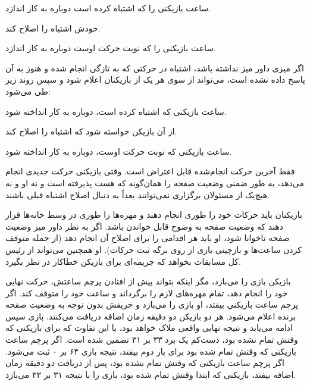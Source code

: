 \begin{bandha}
  \item[الف)] ساعت بازیکنی را که اشتباه کرده است دوباره به کار اندازد.
  \item[ب)] خودش اشتباه را اصلاح کند.
  \item[ج)] ساعت بازیکنی را که نوبت حرکت اوست دوباره به کار اندازد.
\end{bandha}

اگر میزی داور میز نداشته باشد، اشتباه در حرکتی که به تازگی انجام شده و هنوز به آن پاسخ داده نشده است، می‌تواند از سوی هر یک از بازیکنان اعلام شود و سپس روند زیر طی می‌شود:

\begin{bandha}
  \item[الف)] ساعت بازیکنی که اشتباه کرده است، دوباره به کار انداخته شود.
  \item[ب)] از آن بازیکن خواسته شود که اشتباه را اصلاح کند.
  \item[ج)] ساعت بازیکنی که نوبت حرکت اوست، دوباره به کار انداخته شود.
\end{bandha}


فقط آخرین حرکت انجام‌شده قابل اعتراض است. وقتی بازیکنی حرکت جدیدی انجام می‌دهد، به طور ضمنی وضعیت صفحه را همان‌گونه که هست پذیرفته است و نه او و نه هیچ‌یک از مسئولان برگزاری نمی‌توانند بعداً به دنبال اصلاح اشتباه قبلی باشند.


بازیکنان باید حرکات خود را طوری انجام دهند و مهره‌ها را طوری در وسط خانه‌ها قرار دهند که وضعیت صفحه به وضوح قابل خواندن باشد. اگر به نظر داور میز وضعیت صفحه ناخوانا شود، او باید هر اقدامی را برای اصلاح آن انجام دهد (از جمله متوقف کردن ساعت‌ها و بازچینی بازی از روی برگه ثبت حرکات). او همچنین می‌تواند از رئیس کل مسابقات بخواهد که جریمه‌ای برای بازیکن خطاکار در نظر بگیرد.


بازیکن بازی را می‌بازد، مگر اینکه بتواند پیش از افتادن پرچم ساعتش، حرکت نهایی خود را انجام دهد، تمام مهره‌های لازم را برگرداند و ساعت خود را متوقف کند. اگر پرچم ساعت بازیکنی بیفتد، او بازی را می‌بازد و حریفش بدون توجه به وضعیت صفحه برنده اعلام می‌شود. هر دو بازیکن دو دقیقه زمان اضافه دریافت می‌کنند. بازی سپس ادامه می‌یابد و نتیجه نهایی واقعی ملاک خواهد بود، با این تفاوت که برای بازیکنی که وقتش تمام نشده بود، دست‌کم یک برد ۳۳ بر ۳۱ تضمین شده است. اگر پرچم ساعت بازیکنی که وقتش تمام شده بود برای بار دوم بیفتد، نتیجه بازی ۶۴ بر ۰ ثبت می‌شود. اگر پرچم ساعت بازیکنی که وقتش تمام نشده بود، پس از دریافت دو دقیقه زمان اضافه بیفتد، بازیکنی که ابتدا وقتش تمام شده بود، بازی را با نتیجه ۳۱ بر ۳۳ می‌بازد.

